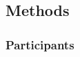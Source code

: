 \documentclass[10pt,letterpaper]{article}
\begin{document}

\subsection{Methods}\label{methods-2}

\subsubsection{Participants}\label{participants-2}
\end{document}
